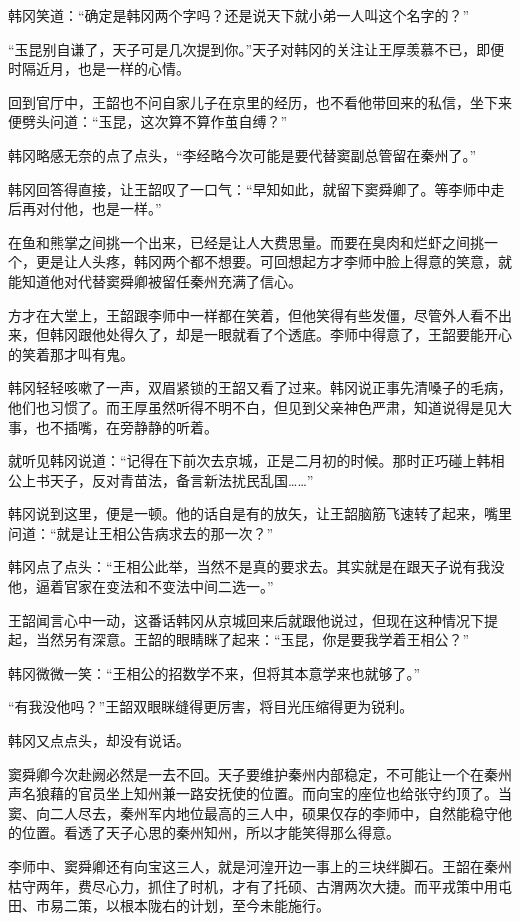 韩冈笑道：“确定是韩冈两个字吗？还是说天下就小弟一人叫这个名字的？”

“玉昆别自谦了，天子可是几次提到你。”天子对韩冈的关注让王厚羡慕不已，即便时隔近月，也是一样的心情。

回到官厅中，王韶也不问自家儿子在京里的经历，也不看他带回来的私信，坐下来便劈头问道：“玉昆，这次算不算作茧自缚？”

韩冈略感无奈的点了点头，“李经略今次可能是要代替窦副总管留在秦州了。”

韩冈回答得直接，让王韶叹了一口气：“早知如此，就留下窦舜卿了。等李师中走后再对付他，也是一样。”

在鱼和熊掌之间挑一个出来，已经是让人大费思量。而要在臭肉和烂虾之间挑一个，更是让人头疼，韩冈两个都不想要。可回想起方才李师中脸上得意的笑意，就能知道他对代替窦舜卿被留任秦州充满了信心。

方才在大堂上，王韶跟李师中一样都在笑着，但他笑得有些发僵，尽管外人看不出来，但韩冈跟他处得久了，却是一眼就看了个透底。李师中得意了，王韶要能开心的笑着那才叫有鬼。

韩冈轻轻咳嗽了一声，双眉紧锁的王韶又看了过来。韩冈说正事先清嗓子的毛病，他们也习惯了。而王厚虽然听得不明不白，但见到父亲神色严肃，知道说得是见大事，也不插嘴，在旁静静的听着。

就听见韩冈说道：“记得在下前次去京城，正是二月初的时候。那时正巧碰上韩相公上书天子，反对青苗法，备言新法扰民乱国……”

韩冈说到这里，便是一顿。他的话自是有的放矢，让王韶脑筋飞速转了起来，嘴里问道：“就是让王相公告病求去的那一次？”

韩冈点了点头：“王相公此举，当然不是真的要求去。其实就是在跟天子说有我没他，逼着官家在变法和不变法中间二选一。”

王韶闻言心中一动，这番话韩冈从京城回来后就跟他说过，但现在这种情况下提起，当然另有深意。王韶的眼睛眯了起来：“玉昆，你是要我学着王相公？”

韩冈微微一笑：“王相公的招数学不来，但将其本意学来也就够了。”

“有我没他吗？”王韶双眼眯缝得更厉害，将目光压缩得更为锐利。

韩冈又点点头，却没有说话。

窦舜卿今次赴阙必然是一去不回。天子要维护秦州内部稳定，不可能让一个在秦州声名狼藉的官员坐上知州兼一路安抚使的位置。而向宝的座位也给张守约顶了。当窦、向二人尽去，秦州军内地位最高的三人中，硕果仅存的李师中，自然能稳守他的位置。看透了天子心思的秦州知州，所以才能笑得那么得意。

李师中、窦舜卿还有向宝这三人，就是河湟开边一事上的三块绊脚石。王韶在秦州枯守两年，费尽心力，抓住了时机，才有了托硕、古渭两次大捷。而平戎策中用屯田、市易二策，以根本陇右的计划，至今未能施行。

